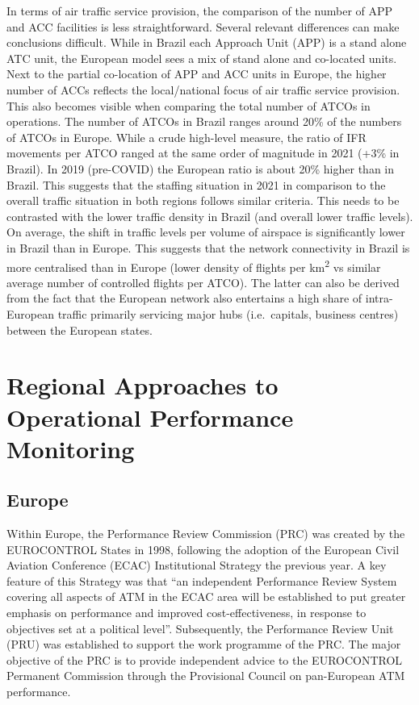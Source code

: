 \documentclass[
  a4paper,
  DIV=11,
  numbers=noendperiod]{scrreprt}
\begin{document}
In terms of air traffic service provision, the comparison of the number
of APP and ACC facilities is less straightforward. Several relevant
differences can make conclusions difficult. While in Brazil each
Approach Unit (APP) is a stand alone ATC unit, the European model sees a
mix of stand alone and co-located units.\\
Next to the partial co-location of APP and ACC units in Europe, the
higher number of ACCs reflects the local/national focus of air traffic
service provision. This also becomes visible when comparing the total
number of ATCOs in operations. The number of ATCOs in Brazil ranges
around 20\% of the numbers of ATCOs in Europe. While a crude high-level
measure, the ratio of IFR movements per ATCO ranged at the same order of
magnitude in 2021 (+3\% in Brazil). In 2019 (pre-COVID) the European
ratio is about 20\% higher than in Brazil. This suggests that the
staffing situation in 2021 in comparison to the overall traffic
situation in both regions follows similar criteria. This needs to be
contrasted with the lower traffic density in Brazil (and overall lower
traffic levels). On average, the shift in traffic levels per volume of
airspace is significantly lower in Brazil than in Europe. This suggests
that the network connectivity in Brazil is more centralised than in
Europe (lower density of flights per km\textsuperscript{2} vs similar
average number of controlled flights per ATCO). The latter can also be
derived from the fact that the European network also entertains a high
share of intra-European traffic primarily servicing major hubs
(i.e.~capitals, business centres) between the European states.

\hypertarget{regional-approaches-to-operational-performance-monitoring}{%
\section{Regional Approaches to Operational Performance
Monitoring}\label{regional-approaches-to-operational-performance-monitoring}}

\hypertarget{europe}{%
\subsection{Europe}\label{europe}}

Within Europe, the Performance Review Commission (PRC) was created by
the EUROCONTROL States in 1998, following the adoption of the European
Civil Aviation Conference (ECAC) Institutional Strategy the previous
year. A key feature of this Strategy was that ``an independent
Performance Review System covering all aspects of ATM in the ECAC area
will be established to put greater emphasis on performance and improved
cost-effectiveness, in response to objectives set at a political
level''. Subsequently, the Performance Review Unit (PRU) was established
to support the work programme of the PRC. The major objective of the PRC
is to provide independent advice to the EUROCONTROL Permanent Commission
through the Provisional Council on pan-European ATM performance.
\end{document}
